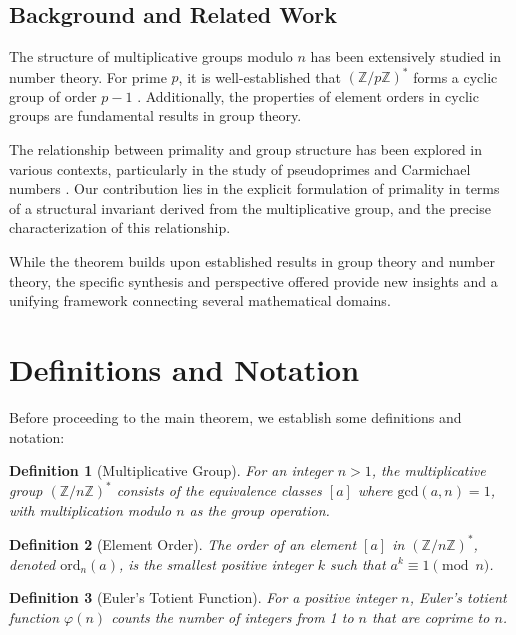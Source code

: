 \documentclass[11pt,a4paper]{article}
\newtheorem{definition}{Definition}
\newcommand{\Z}{\mathbb{Z}}
\newcommand{\gcd}{\mathrm{gcd}}
\newcommand{\ord}{\mathrm{ord}}
\newcommand{\ZnZstar}[1]{(\Z/{#1}\Z)^{*}}
\newcommand{\totient}{\varphi}
\begin{document}
\subsection{Background and Related Work}

The structure of multiplicative groups modulo $n$ has been extensively studied in number theory. For prime $p$, it is well-established that $\ZnZstar{p}$ forms a cyclic group of order $p-1$ \cite{hardy}. Additionally, the properties of element orders in cyclic groups are fundamental results in group theory.

The relationship between primality and group structure has been explored in various contexts, particularly in the study of pseudoprimes and Carmichael numbers \cite{carmichael}. Our contribution lies in the explicit formulation of primality in terms of a structural invariant derived from the multiplicative group, and the precise characterization of this relationship.

While the theorem builds upon established results in group theory and number theory, the specific synthesis and perspective offered provide new insights and a unifying framework connecting several mathematical domains.

\section{Definitions and Notation}

Before proceeding to the main theorem, we establish some definitions and notation:

\begin{definition}[Multiplicative Group]
For an integer $n > 1$, the multiplicative group $\ZnZstar{n}$ consists of the equivalence classes $[a]$ where $\gcd(a,n) = 1$, with multiplication modulo $n$ as the group operation.
\end{definition}

\begin{definition}[Element Order]
The order of an element $[a]$ in $\ZnZstar{n}$, denoted $\ord_n(a)$, is the smallest positive integer $k$ such that $a^k \equiv 1 \pmod{n}$.
\end{definition}

\begin{definition}[Euler's Totient Function]
For a positive integer $n$, Euler's totient function $\totient(n)$ counts the number of integers from 1 to $n$ that are coprime to $n$.
\end{definition}
\end{document}
